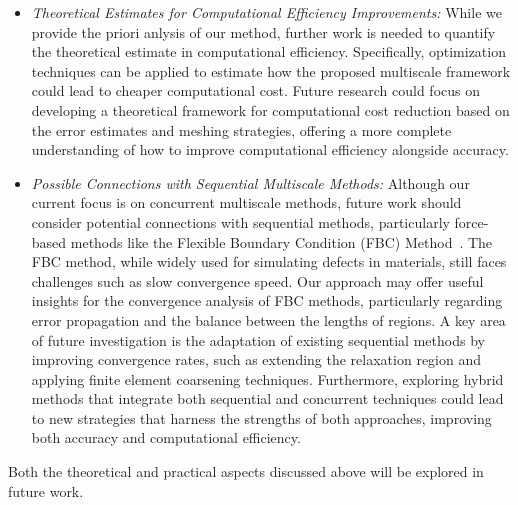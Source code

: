 \begin{itemize}
	\item {\it Theoretical Estimates for Computational Efficiency Improvements:} While we provide the priori anlysis of our method, further work is needed to quantify the theoretical estimate in computational efficiency. Specifically, optimization techniques can be applied to estimate how the proposed multiscale framework could lead to cheaper computational cost. Future research could focus on developing a theoretical framework for computational cost reduction based on the error estimates and meshing strategies, offering a more complete understanding of how to improve computational efficiency alongside accuracy.

    \item {\it Possible Connections with Sequential Multiscale Methods:} Although our current focus is on concurrent multiscale methods, future work should consider potential connections with sequential methods, particularly force-based methods like the Flexible Boundary Condition (FBC) Method~\cite{2002_CW_SR_FBC_Dislocation_PHYS,2021_MH_Anal_FBC_AC_MMS,2008_RT_LGF_Long-range_PHYS}. The FBC method, while widely used for simulating defects in materials, still faces challenges such as slow convergence speed. Our approach may offer useful insights for the convergence analysis of FBC methods, particularly regarding error propagation and the balance between the lengths of regions. A key area of future investigation is the adaptation of existing sequential methods by improving convergence rates, such as extending the relaxation region and applying finite element coarsening techniques. Furthermore, exploring hybrid methods that integrate both sequential and concurrent techniques could lead to new strategies that harness the strengths of both approaches, improving both accuracy and computational efficiency.

	
\end{itemize}


Both the theoretical and practical aspects discussed above will be explored in future work.

